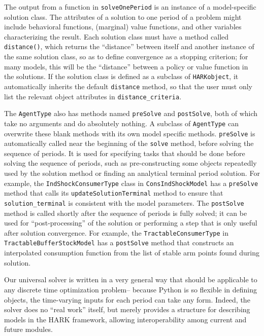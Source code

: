 \documentclass[12pt,titlepage,letterpaper]{econtex}
\begin{document}
{The output from a function in \texttt{solveOnePeriod} is an instance of a model-specific solution class.  The attributes of a solution to one period of a problem might include behavioral functions, (marginal) value functions, and other variables characterizing the result.  Each solution class must have a method called \texttt{distance()}, which returns the ``distance'' between itself and another instance of the same solution class, so as to define convergence as a stopping criterion; for many models, this will be the ``distance'' between a policy or value function in the solutions.  If the solution class is defined as a subclass of \texttt{HARKobject}, it automatically inherits the default \texttt{distance} method, so that the user must only list the relevant object attributes in \texttt{distance\_criteria}.

The \texttt{AgentType} also has methods named \texttt{preSolve} and \texttt{postSolve}, both of which take no arguments and do absolutely nothing.  A subclass of \texttt{AgentType} can overwrite these blank methods with its own model specific methods.  \texttt{preSolve} is automatically called near the beginning of the \texttt{solve} method, before solving the sequence of periods.  It is used for specifying tasks that should be done before solving the sequence of periods, such as pre-constructing some objects repeatedly used by the solution method or finding an analytical terminal period solution.  For example, the \texttt{IndShockConsumerType} class in \texttt{ConsIndShockModel} has a \texttt{preSolve} method that calls its \texttt{updateSolutionTerminal} method to ensure that \texttt{solution\_terminal} is consistent with the model parameters.  The \texttt{postSolve} method is called shortly after the sequence of periods is fully solved; it can be used for ``post-processing'' of the solution or performing a step that is only useful after solution convergence.  For example, the \texttt{TractableConsumerType} in \texttt{TractableBufferStockModel} has a \texttt{postSolve} method that constructs an interpolated consumption function from the list of stable arm points found during solution.

Our universal solver is written in a very general way that should be applicable to any discrete time optimization problem-- because Python is so flexible in defining objects, the time-varying inputs for each period can take any form.  Indeed, the solver does no ``real work'' itself, but merely provides a structure for describing models in the HARK framework, allowing interoperability among current and future modules.

}
\end{document}
